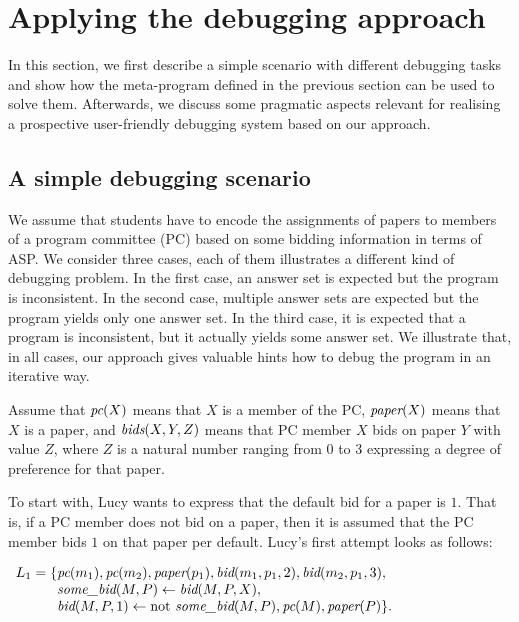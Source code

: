 \documentclass{tlp}
\newcommand{\naf}{\mathrm{not}}
\renewcommand{\mathit}[1]{{\text{\it{#1}}}}
\begin{document}
\section{Applying the debugging approach}


In this section, we  first describe a simple scenario with different debugging tasks and 
show how the meta-program defined in the previous section can be used to solve them.
Afterwards, we discuss some pragmatic aspects relevant for realising a prospective user-friendly debugging system based on our approach.

\subsection{A simple debugging scenario}\label{sec:peanuts}

We assume that students have to encode the assignments of  papers to members of a program committee (PC) based on some bidding information in terms of ASP.
We consider three cases, each of them illustrates a different kind of debugging problem.
In the first case, an answer set is expected but the program is inconsistent. In the
second case, multiple answer sets are expected but the program yields only one answer set.
In the third case, it is expected that  a program is inconsistent, but it actually yields some answer set.
We illustrate that, in all cases, our approach gives valuable hints
how to debug the program in an iterative way.

Assume that $\mathit{pc}(X)$ means that $X$ is a member of the PC,  $\mathit{paper}(X)$ means that $X$ is a paper,
and $\mathit{bids}(X,Y,Z)$ means that PC member $X$ bids on paper $Y$ with value $Z$, where $Z$ is a natural number 
ranging from $0$ to $3$
expressing a degree
of preference for that paper.

To start with, Lucy wants to express that the default bid for a paper is $1$. That is, if a PC member does not bid on a paper, then 
it is assumed that the PC member bids $1$ on that paper per default.
Lucy's first attempt looks as follows:
\begin{center}
$\begin{array}{r@{}l}
L_{1} = \{& \mathit{pc}(m_1), \mathit{pc}(m_2), \mathit{paper}(p_1),
            \mathit{bid}(m_1,p_1,2), \mathit{bid}(m_2,p_1,3),\\
           & \mathit{some\_bid}(M,P) \leftarrow \mathit{bid}(M,P,X),\\
           & \mathit{bid}(M,P,1) \leftarrow \naf\ \mathit{some\_bid}(M,P),
            \mathit{pc}(M), \mathit{paper}(P)\}\mbox{.}
\end{array}$
\end{center}
\end{document}
